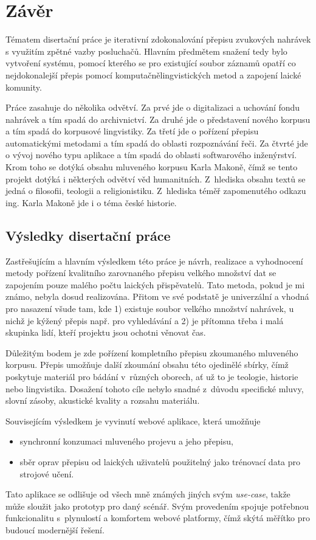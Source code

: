 \chapter{Závěr}
\label{kap:zaver}

Tématem disertační práce je iterativní zdokonalování přepisu zvukových
nahrávek s využitím zpětné vazby posluchačů. Hlavním předmětem snažení
tedy bylo vytvoření systému, pomocí kterého se pro existující soubor
záznamů opatří co nejdokonalejší přepis pomocí komputačnělingvistických metod a
zapojení laické komunity.

Práce zasahuje do několika odvětví.
Za prvé jde o digitalizaci a uchování fondu nahrávek a tím spadá do
archivnictví.
Za druhé jde o představení nového korpusu a tím spadá do korpusové lingvistiky.
Za třetí jde o pořízení přepisu automatickými metodami a tím spadá do oblasti
rozpoznávání řeči.
Za čtvrté jde o vývoj nového typu aplikace a tím spadá do oblasti
softwarového inženýrství.
Krom toho se dotýká obsahu
mluveného korpusu Karla Makoně, čímž se tento projekt dotýká i některých
odvětví věd humanitních. Z~hlediska obsahu textů se jedná o filosofii, teologii
a religionistiku. Z~hlediska téměř zapomenutého odkazu ing. Karla Makoně jde i o
téma české historie.

\section{Výsledky disertační práce}
\label{sec:zaver:vysledky}

Zastřešujícím a hlavním výsledkem této práce je návrh, realizace a vyhodnocení
metody pořízení kvalitního zarovnaného přepisu velkého množství dat se zapojením
pouze malého počtu laických přispěvatelů. Tato metoda, pokud je mi známo, nebyla
dosud realizována. Přitom ve své podstatě je univerzální a vhodná pro nasazení
všude tam, kde 1) existuje soubor velkého množství nahrávek, u nichž je kýžený
přepis např. pro vyhledávání a 2) je přítomna třeba i malá skupinka lidí, kteří
projektu jsou ochotni věnovat čas.

Důležitým bodem je zde pořízení kompletního přepisu zkoumaného mluveného
korpusu. Přepis umožňuje další zkoumání obsahu této ojedinělé sbírky, čímž
poskytuje materiál pro bádání v~různých oborech, ať už to je teologie, historie
nebo lingvistika. Dosažení tohoto cíle nebylo snadné z~důvodu specifické mluvy,
slovní zásoby, akustické kvality a rozsahu materiálu.

Souvisejícím výsledkem je vyvinutí webové aplikace, která umožňuje
\begin{itemize}
\item{synchronní konzumaci mluveného projevu a jeho přepisu,}
\item{
    sběr oprav přepisu od laických uživatelů použitelný jako trénovací data
    pro strojové učení.
}
\end{itemize}
Tato aplikace se odlišuje od všech mně známých jiných svým \textit{use-case},
takže může sloužit jako prototyp pro daný scénář.
Svým provedením spojuje potřebnou funkcionalitu s~plynulostí a komfortem
webové platformy, čímž skýtá měřítko pro budoucí modernější řešení.

